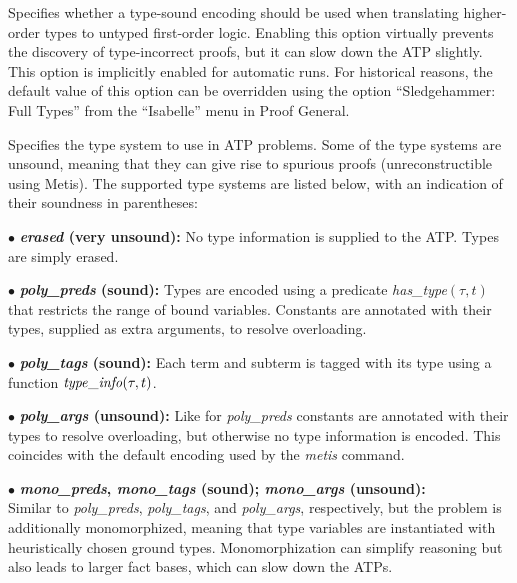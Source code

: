 \documentclass[a4paper,12pt]{article}
\begin{document}
\begin{enum}
Specifies whether a type-sound encoding should be used when translating
higher-order types to untyped first-order logic. Enabling this option virtually
prevents the discovery of type-incorrect proofs, but it can slow down the ATP
slightly. This option is implicitly enabled for automatic runs. For historical
reasons, the default value of this option can be overridden using the option
``Sledgehammer: Full Types'' from the ``Isabelle'' menu in Proof General.

Specifies the type system to use in ATP problems. Some of the type systems are
unsound, meaning that they can give rise to spurious proofs (unreconstructible
using Metis). The supported type systems are listed below, with an indication of
their soundness in parentheses:

\begin{enum}
\item[$\bullet$] \textbf{\textit{erased} (very unsound):} No type information is
supplied to the ATP. Types are simply erased.

\item[$\bullet$] \textbf{\textit{poly\_preds} (sound):} Types are encoded using
a predicate \textit{has\_\allowbreak type\/}$(\tau, t)$ that restricts the range
of bound variables. Constants are annotated with their types, supplied as extra
arguments, to resolve overloading.

\item[$\bullet$] \textbf{\textit{poly\_tags} (sound):} Each term and subterm is
tagged with its type using a function $\mathit{type\_info\/}(\tau, t)$.

\item[$\bullet$] \textbf{\textit{poly\_args} (unsound):}
Like for \textit{poly\_preds} constants are annotated with their types to
resolve overloading, but otherwise no type information is encoded. This
coincides with the default encoding used by the \textit{metis} command.

\item[$\bullet$]
\textbf{%
\textit{mono\_preds}, \textit{mono\_tags} (sound);
\textit{mono\_args} (unsound):} \\
Similar to \textit{poly\_preds}, \textit{poly\_tags}, and \textit{poly\_args},
respectively, but the problem is additionally monomorphized, meaning that type
variables are instantiated with heuristically chosen ground types.
Monomorphization can simplify reasoning but also leads to larger fact bases,
which can slow down the ATPs.


\end{enum}
\end{enum}
\end{document}
